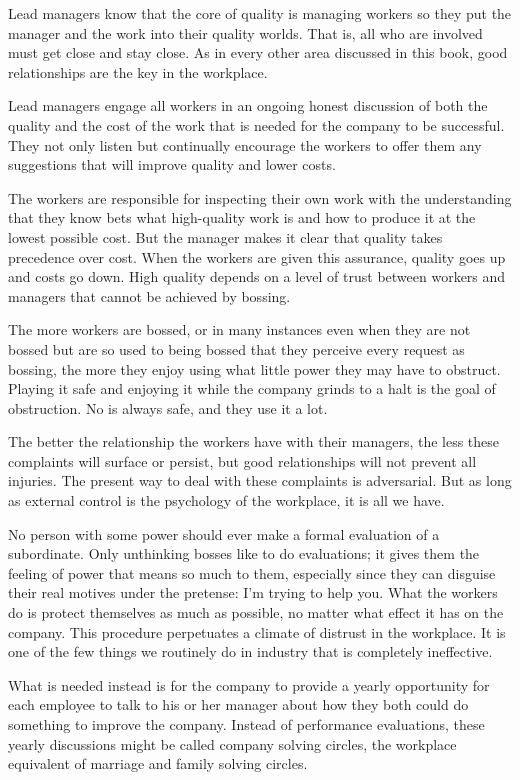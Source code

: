 \documentclass[ebook,12pt,oneside,openany]{memoir}
\begin{document}
Lead managers know that the core of quality is managing workers so they put the manager and the work into their quality worlds.
That is, all who are involved must get close and stay close. As in every other area discussed in this book, good relationships are the key  in the workplace.

Lead managers engage all workers in an ongoing honest discussion of both the quality and the cost of the work that is needed for the company to be successful.
They not only listen but continually encourage the workers to offer them any suggestions that will improve quality and lower costs.

The workers are responsible for inspecting their own work with the understanding that they know bets what high-quality work is and how to produce it at the lowest possible cost.
But the manager makes it clear that quality takes precedence over cost. When the workers are given this assurance, quality goes up and costs go down.
High quality depends on a level of trust between workers and managers that cannot be achieved by bossing.

The more workers are bossed, or in many instances even when they are not bossed but are so used to being bossed that they perceive every request as bossing, 
the more they enjoy using what little power they may have to obstruct.
Playing it safe and enjoying it while the company grinds to a halt is the goal of obstruction.
No is always safe, and they use it a lot.

The better the relationship the workers have with their managers, the less these complaints will surface or persist, but good relationships will not prevent all injuries.
The present way to deal with these complaints is adversarial. But as long as external control is the psychology of the workplace, it is all we have.

No person with some power should ever make a formal evaluation of a subordinate.
Only unthinking bosses like to do evaluations; it gives them the feeling of power that means so much to them, especially since they can disguise their real motives under the pretense: I'm trying to help you.
What the workers do is protect themselves as much as possible, no matter what effect it has on the company.
This procedure perpetuates a climate of distrust in the workplace.
It is one of the few things we routinely do in industry that is completely ineffective.

What is needed instead is for the company to provide a yearly opportunity for each employee to talk to his or her manager about how they both could do something to improve the company.
Instead of performance evaluations, these yearly discussions might be called company solving circles, the workplace equivalent of marriage and family solving circles.
\end{document}
